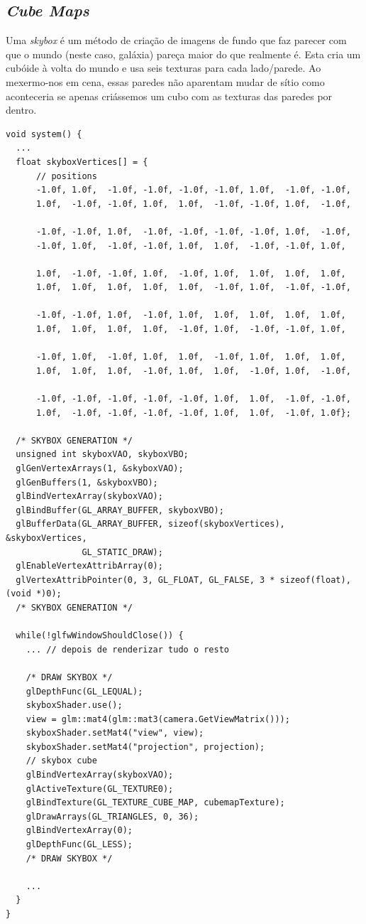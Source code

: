 \subsection{\textit{Cube Maps}}
\label{chap2:sec:cube_maps}

\noindent
Uma \textit{skybox} é um método de criação de imagens de fundo que 
faz parecer com que o mundo (neste caso, galáxia) pareça maior do que realmente é. 
Esta cria um cubóide à volta do mundo e usa seis texturas para cada lado/parede. 
Ao mexermo-nos em cena, essas paredes não aparentam mudar de sítio como aconteceria se apenas criássemos um cubo com as texturas das paredes por dentro.

\enlargethispage{1in}
\begin{lstlisting}[style=Cpp, caption=\textit{Cubemap} para a \textit{Skybox}]
void system() {
  ...
  float skyboxVertices[] = {
      // positions
      -1.0f, 1.0f,  -1.0f, -1.0f, -1.0f, -1.0f, 1.0f,  -1.0f, -1.0f,
      1.0f,  -1.0f, -1.0f, 1.0f,  1.0f,  -1.0f, -1.0f, 1.0f,  -1.0f,

      -1.0f, -1.0f, 1.0f,  -1.0f, -1.0f, -1.0f, -1.0f, 1.0f,  -1.0f,
      -1.0f, 1.0f,  -1.0f, -1.0f, 1.0f,  1.0f,  -1.0f, -1.0f, 1.0f,

      1.0f,  -1.0f, -1.0f, 1.0f,  -1.0f, 1.0f,  1.0f,  1.0f,  1.0f,
      1.0f,  1.0f,  1.0f,  1.0f,  1.0f,  -1.0f, 1.0f,  -1.0f, -1.0f,

      -1.0f, -1.0f, 1.0f,  -1.0f, 1.0f,  1.0f,  1.0f,  1.0f,  1.0f,
      1.0f,  1.0f,  1.0f,  1.0f,  -1.0f, 1.0f,  -1.0f, -1.0f, 1.0f,

      -1.0f, 1.0f,  -1.0f, 1.0f,  1.0f,  -1.0f, 1.0f,  1.0f,  1.0f,
      1.0f,  1.0f,  1.0f,  -1.0f, 1.0f,  1.0f,  -1.0f, 1.0f,  -1.0f,

      -1.0f, -1.0f, -1.0f, -1.0f, -1.0f, 1.0f,  1.0f,  -1.0f, -1.0f,
      1.0f,  -1.0f, -1.0f, -1.0f, -1.0f, 1.0f,  1.0f,  -1.0f, 1.0f};

  /* SKYBOX GENERATION */
  unsigned int skyboxVAO, skyboxVBO;
  glGenVertexArrays(1, &skyboxVAO);
  glGenBuffers(1, &skyboxVBO);
  glBindVertexArray(skyboxVAO);
  glBindBuffer(GL_ARRAY_BUFFER, skyboxVBO);
  glBufferData(GL_ARRAY_BUFFER, sizeof(skyboxVertices), &skyboxVertices,
               GL_STATIC_DRAW);
  glEnableVertexAttribArray(0);
  glVertexAttribPointer(0, 3, GL_FLOAT, GL_FALSE, 3 * sizeof(float), (void *)0);
  /* SKYBOX GENERATION */

  while(!glfwWindowShouldClose()) {
    ... // depois de renderizar tudo o resto

    /* DRAW SKYBOX */
    glDepthFunc(GL_LEQUAL);
    skyboxShader.use();
    view = glm::mat4(glm::mat3(camera.GetViewMatrix()));
    skyboxShader.setMat4("view", view);
    skyboxShader.setMat4("projection", projection);
    // skybox cube
    glBindVertexArray(skyboxVAO);
    glActiveTexture(GL_TEXTURE0);
    glBindTexture(GL_TEXTURE_CUBE_MAP, cubemapTexture);
    glDrawArrays(GL_TRIANGLES, 0, 36);
    glBindVertexArray(0);
    glDepthFunc(GL_LESS);
    /* DRAW SKYBOX */

    ...
  }
}
\end{lstlisting}

